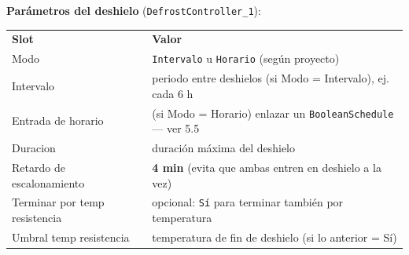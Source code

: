 \documentclass[11pt,a4paper]{article}
\newcommand{\code}[1]{\texttt{#1}}
\newcommand{\cabfila}{\color{white}\bfseries}
\begin{document}
\noindent\textbf{Parámetros del deshielo} (\code{DefrostController_1}):
\begin{center}\small
{}
\begin{tabular}{L{5.2cm} L{8.4cm}}
\cabfila \textbf{Slot} & \cabfila \textbf{Valor} \\
Modo & \code{Intervalo} u \code{Horario} (según proyecto) \\
Intervalo & periodo entre deshielos (si Modo = Intervalo), ej. cada 6 h \\
Entrada de horario & (si Modo = Horario) enlazar un \code{BooleanSchedule} — ver 5.5 \\
Duracion & duración máxima del deshielo \\
Retardo de escalonamiento & \textbf{4 min} (evita que ambas entren en deshielo a la vez) \\
Terminar por temp resistencia & opcional: \code{Sí} para terminar también por temperatura \\
Umbral temp resistencia & temperatura de fin de deshielo (si lo anterior = Sí) \\
\end{tabular}
\end{center}
\end{document}
